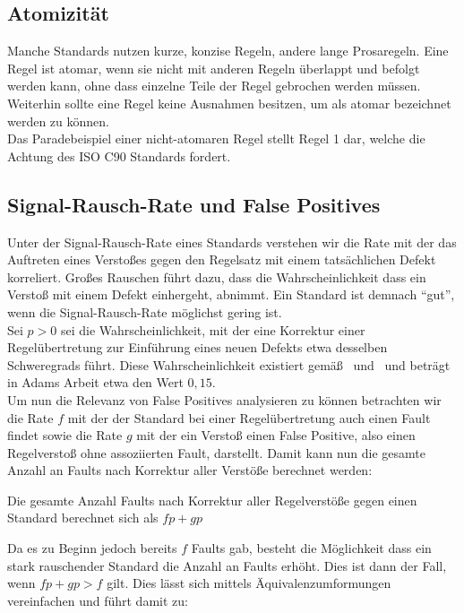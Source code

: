 \documentclass[a4paper,UKenglish,cleveref, autoref]{templates/lipics-v2019}
\begin{document}
    \subsection{Atomizität}
    \label{subsec:atomizität}
    Manche Standards nutzen kurze, konzise Regeln, andere lange Prosaregeln.
    Eine Regel ist atomar, wenn sie nicht mit anderen Regeln überlappt und befolgt werden kann, ohne dass einzelne Teile der Regel gebrochen werden müssen.
    Weiterhin sollte eine Regel keine Ausnahmen besitzen, um als atomar bezeichnet werden zu können.\\
    Das Paradebeispiel einer nicht-atomaren Regel stellt Regel 1 dar, welche die Achtung des ISO C90 Standards fordert.

    \subsection{Signal-Rausch-Rate und False Positives}
    \label{subsec:signal-rausch-rate-und-false-positives}

    Unter der Signal-Rausch-Rate eines Standards verstehen wir die Rate mit der das Auftreten eines Verstoßes gegen den Regelsatz mit einem
    tatsächlichen Defekt korreliert.
    Großes Rauschen führt dazu, dass die Wahrscheinlichkeit dass ein Verstoß mit einem Defekt einhergeht, abnimmt.
    Ein Standard ist demnach \enquote{gut}, wenn die Signal-Rausch-Rate möglichst gering ist.\\
    Sei $p > 0$ sei die Wahrscheinlichkeit, mit der eine Korrektur einer Regelübertretung zur Einführung eines neuen Defekts
    etwa desselben Schweregrads führt.
    Diese Wahrscheinlichkeit existiert gemäß~\cite{transgression-data} und~\cite{hatton2007language} und beträgt in
    Adams Arbeit etwa den Wert $0,15$.\\
    Um nun die Relevanz von False Positives analysieren zu können betrachten wir die Rate $f$ mit der der Standard
    bei einer Regelübertretung auch einen Fault findet sowie die Rate $g$ mit der ein Verstoß einen False Positive, also
    einen Regelverstoß ohne assoziierten Fault, darstellt.
    Damit kann nun die gesamte Anzahl an Faults nach Korrektur aller Verstöße berechnet werden:
    \begin{lemma}
        Die gesamte Anzahl Faults nach Korrektur aller Regelverstöße gegen einen Standard berechnet sich als $fp + gp$
    \end{lemma}

    Da es zu Beginn jedoch bereits $f$ Faults gab, besteht die Möglichkeit dass ein stark rauschender Standard die Anzahl
    an Faults erhöht.
    Dies ist dann der Fall, wenn $fp + gp > f$ gilt.
    Dies lässt sich mittels Äquivalenzumformungen vereinfachen und führt damit zu:
\end{document}
